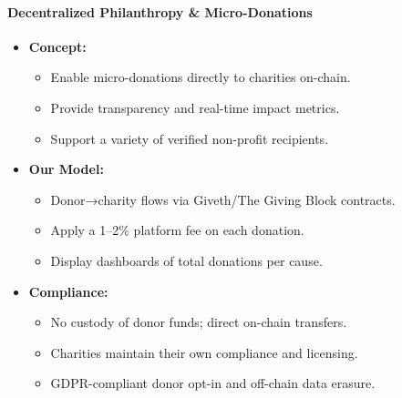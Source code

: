 \documentclass[13pt]{extarticle}
\begin{document}
\paragraph{Decentralized Philanthropy \& Micro-Donations}
\begin{itemize}[left=1em]
  \item \textbf{Concept:}
    \begin{itemize}[left=1.2em]
      \item Enable micro-donations directly to charities on-chain.
      \item Provide transparency and real-time impact metrics.
      \item Support a variety of verified non-profit recipients.
    \end{itemize}
  \item \textbf{Our Model:}
    \begin{itemize}[left=1.2em]
      \item Donor→charity flows via Giveth/The Giving Block contracts.
      \item Apply a 1–2\% platform fee on each donation.
      \item Display dashboards of total donations per cause.
    \end{itemize}
  \item \textbf{Compliance:}
    \begin{itemize}[left=1.2em]
      \item No custody of donor funds; direct on-chain transfers.
      \item Charities maintain their own compliance and licensing.
      \item GDPR-compliant donor opt-in and off-chain data erasure.
    \end{itemize}
\end{itemize}
\end{document}
